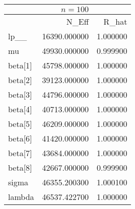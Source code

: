 \begin{tabular}{lrr}
& $ n = 100 $ & \\
\toprule
 & N\_Eff & R\_hat \\
\midrule
lp\_\_ & 16390.000000 & 1.000000 \\
mu & 49930.000000 & 0.999900 \\
beta[1] & 45798.000000 & 1.000000 \\
beta[2] & 39123.000000 & 1.000000 \\
beta[3] & 44796.000000 & 1.000000 \\
beta[4] & 40713.000000 & 1.000000 \\
beta[5] & 46209.000000 & 1.000000 \\
beta[6] & 41420.000000 & 1.000000 \\
beta[7] & 43684.000000 & 1.000000 \\
beta[8] & 42667.000000 & 0.999900 \\
sigma & 46355.200300 & 1.000100 \\
lambda & 46537.422700 & 1.000000 \\
\bottomrule
\end{tabular}
